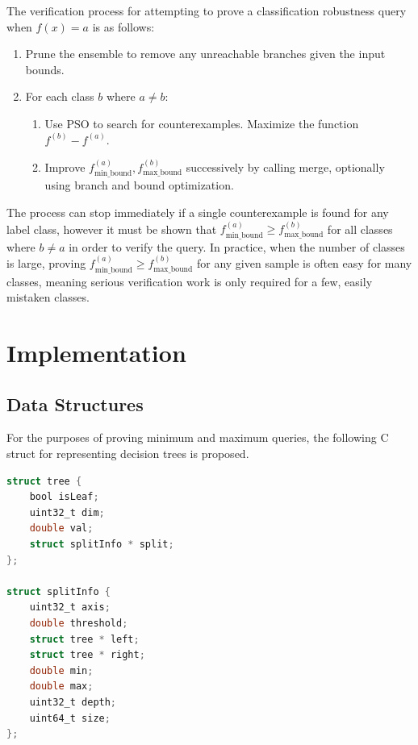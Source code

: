 \documentclass[pageno]{jpaper}
\newcommand{\fminb}{f_{\textrm{min\_bound}}}
\newcommand{\fmaxb}{f_{\textrm{max\_bound}}}
\begin{document}
\begin{doublespacing}
The verification process for attempting to prove a classification robustness query when $f(x) = a$ is as follows:

\begin{enumerate}
\item Prune the ensemble to remove any unreachable branches given the input bounds.
\item For each class $b$ where $a \ne b$:
\begin{enumerate}
\item Use PSO to search for counterexamples. Maximize the function $f^{(b)} - f^{(a)}$.
\item Improve $\fminb^{(a)}, \fmaxb^{(b)}$ successively by calling merge, optionally using branch and bound optimization.
\end{enumerate}
\end{enumerate}

The process can stop immediately if a single counterexample is found for any label class, however it must be shown that $\fminb^{(a)} \ge \fmaxb^{(b)}$ for all classes where $b \ne a$ in order to verify the query. In practice, when the number of classes is large, proving $\fminb^{(a)} \ge \fmaxb^{(b)}$ for any given sample is often easy for many classes, meaning serious verification work is only required for a few, easily mistaken classes.

\section{Implementation}
\subsection{Data Structures}
\label{sec:data-structures}
For the purposes of proving minimum and maximum queries, the following C struct for representing decision trees is proposed.

{\singlespacing
\begin{lstlisting}[language=C, caption=decision tree data structure, label=lst:c-struct]
struct tree {
    bool isLeaf;
    uint32_t dim;
    double val;
    struct splitInfo * split;
};

struct splitInfo {
    uint32_t axis;
    double threshold;
    struct tree * left;
    struct tree * right;
    double min;
    double max;
    uint32_t depth;
    uint64_t size;
};
\end{lstlisting}
}


\end{doublespacing}
\end{document}
